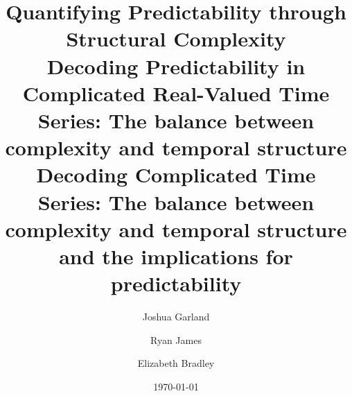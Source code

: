 \documentclass[%
 reprint,
nofootinbib,
nobibnotes,
 amsmath,amssymb,
]{revtex4-1}
\begin{document}


\title{
{\color{green}Quantifying Predictability through Structural Complexity} 
\\Decoding Predictability in Complicated Real-Valued Time Series: The balance between complexity and temporal structure
\\Decoding Complicated Time Series: The balance between complexity and temporal structure and the implications for predictability
}






\author{Joshua Garland}
\author{Ryan James}%
%
\author{Elizabeth Bradley}
%
%



\date{\today}%
\end{document}
